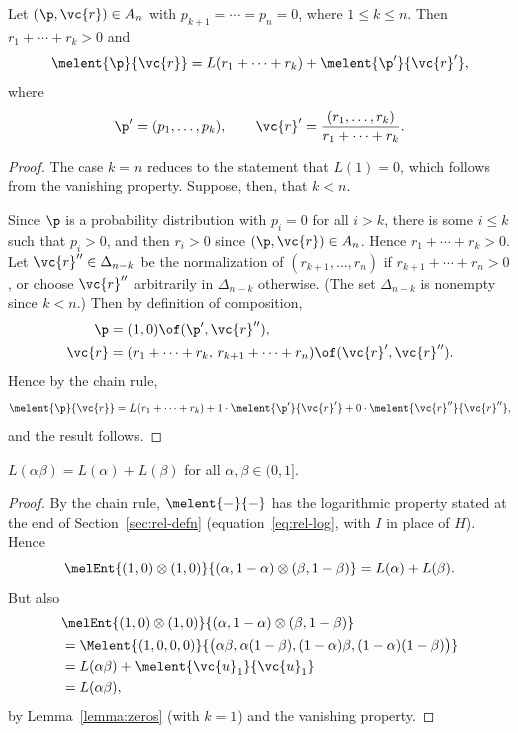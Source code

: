 \begin{lemma}
Let $(\p, \vc{r}) \in A_n$ with $p_{k + 1} = \cdots = p_n = 0$, where $1
\leq k \leq n$.  Then $r_1 + \cdots + r_k > 0$ and
\[
\melent{\p}{\vc{r}} 
=
L(r_1 + \cdots + r_k) 
+
\melent{\p'}{\vc{r}'},
\]
where 
\[
\p' = (p_1, \ldots, p_k),
\qquad
\vc{r}' = \frac{(r_1, \ldots, r_k)}{r_1 + \cdots + r_k}.
\]
\end{lemma}

\begin{proof}
The case $k = n$ reduces to the statement that $L(1) = 0$, which follows
from the vanishing property.  Suppose, then, that $k < n$.  

Since $\p$ is a probability distribution with $p_i = 0$ for all $i > k$,
there is some $i \leq k$ such that $p_i > 0$, and then $r_i > 0$ since
$(\p, \vc{r}) \in A_n$.  Hence $r_1 + \cdots + r_k > 0$.  Let $\vc{r}'' \in
\Delta_{n - k}$ be the normalization of $(r_{k + 1}, \ldots, r_n)$ if $r_{k
  + 1} + \cdots + r_n > 0$, or choose $\vc{r}''$ arbitrarily in $\Delta_{n
  - k}$ otherwise.  (The set $\Delta_{n - k}$ is nonempty since $k < n$.)
Then by definition of composition,
% 
\begin{align*}
\p      &
= 
(1, 0) \of (\p', \vc{r}''),  \\
\vc{r}  &
= 
(r_1 + \cdots + r_k, \, r_{k + 1} + \cdots + r_n) \of (\vc{r}', \vc{r}'').
\end{align*}
% 
Hence by the chain rule, 
\[
\melent{\p}{\vc{r}}
=
L(r_1 + \cdots + r_k) +
1 \cdot \melent{\p'}{\vc{r}'} + 
0 \cdot \melent{\vc{r}''}{\vc{r}''},
\]
% 
and the result follows. 
\end{proof}

\begin{lemma}
$L(\alpha\beta) = L(\alpha) + L(\beta)$ for all $\alpha, \beta \in (0,
1]$. 
\end{lemma}

\begin{proof}
By the chain rule, $\melent{-}{-}$ has the logarithmic property stated at
the end of Section~\ref{sec:rel-defn} (equation~\eqref{eq:rel-log}, with
$I$ in place of $H$).  Hence
\[
\melEnt{(1, 0) \otimes (1, 0)}{(\alpha, 1 - \alpha) \otimes (\beta, 1 -
  \beta)}
=
L(\alpha) + L(\beta).
\]
But also
% 
\begin{align*}
&\melEnt{(1, 0) \otimes (1, 0)}%
{(\alpha, 1 - \alpha) \otimes (\beta, 1 - \beta)}       \\
&
=
\Melent{(1, 0, 0, 0)}%
{\bigl(\alpha\beta, \alpha(1 - \beta), 
(1 - \alpha)\beta, (1 - \alpha)(1 - \beta)\bigr)}       \\
&
=
L(\alpha\beta) + \melent{\vc{u}_1}{\vc{u}_1}    \\
&
=
L(\alpha\beta),
\end{align*}
% 
by Lemma~\ref{lemma:zeros} (with $k = 1$) and the vanishing property.  
\end{proof}

